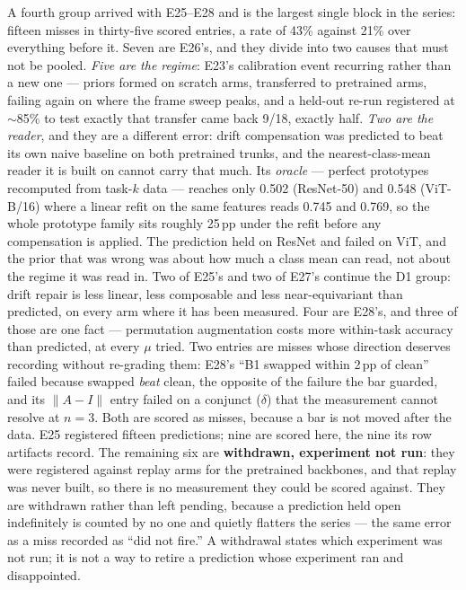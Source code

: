 A fourth group arrived with E25--E28 and is the largest single block in the
series: fifteen misses in thirty-five scored entries, a rate of 43\% against
21\% over everything before it. Seven are E26's, and they divide into two
causes that must not be pooled. \emph{Five are the regime}: E23's calibration
event recurring rather than a new one --- priors formed on scratch arms,
transferred to pretrained arms, failing again on where the frame sweep peaks,
and a held-out re-run registered at $\sim$85\% to test exactly that transfer
came back 9/18, exactly half. \emph{Two are the reader}, and they are a
different error: drift compensation was predicted to beat its own naive
baseline on both pretrained trunks, and the nearest-class-mean reader it is
built on cannot carry that much. Its \emph{oracle} --- perfect prototypes
recomputed from task-$k$ data --- reaches only 0.502 (ResNet-50) and 0.548
(ViT-B/16) where a linear refit on the same features reads 0.745 and 0.769,
so the whole prototype family sits roughly 25\,pp under the refit before any
compensation is applied. The prediction held on ResNet and failed on ViT, and
the prior that was wrong was about how much a class mean can read, not about
the regime it was read in. Two of E25's and two of E27's continue the D1 group:
drift repair is less linear, less composable and less near-equivariant than
predicted, on every arm where it has been measured. Four are E28's, and three
of those are one fact --- permutation augmentation costs more within-task
accuracy than predicted, at every $\mu$ tried. Two entries are misses whose
direction deserves recording without re-grading them: E28's ``B1 swapped
within 2\,pp of clean'' failed because swapped \emph{beat} clean, the opposite
of the failure the bar guarded, and its $\|A-I\|$ entry failed on a conjunct
($\delta$) that the measurement cannot resolve at $n=3$. Both are scored as
misses, because a bar is not moved after the data.
E25 registered fifteen predictions; nine are scored here, the nine its row
artifacts record. The remaining six are \textbf{withdrawn, experiment not
run}: they were registered against replay arms for the pretrained backbones,
and that replay was never built, so there is no measurement they could be
scored against. They are withdrawn rather than left pending, because a
prediction held open indefinitely is counted by no one and quietly flatters
the series --- the same error as a miss recorded as ``did not fire.'' A
withdrawal states which experiment was not run; it is not a way to retire a
prediction whose experiment ran and disappointed.
